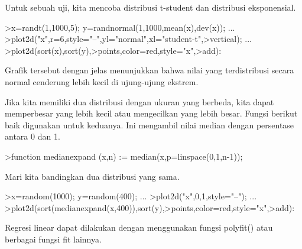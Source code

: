 \documentclass[12pt,arial,letterpaper]{book}
\begin{document}
\begin{eulercomment}
\begin{eulercomment}
\begin{eulercomment}
\begin{eulercomment}
\begin{eulercomment}
\begin{eulercomment}
\begin{eulercomment}
\begin{eulercomment}
\begin{eulercomment}
\begin{eulercomment}
\begin{eulercomment}
\begin{eulercomment}
\begin{eulercomment}
\begin{eulercomment}
\begin{eulercomment}
\begin{eulercomment}
\begin{eulercomment}
\begin{eulercomment}
\begin{eulercomment}
\begin{eulercomment}
\begin{eulercomment}
\begin{eulercomment}
\begin{eulercomment}
\begin{eulercomment}
\begin{eulercomment}
\begin{eulercomment}
\begin{eulercomment}
\begin{eulercomment}
\begin{eulercomment}
\begin{eulercomment}
\begin{eulercomment}
\begin{eulercomment}
\begin{eulercomment}
Untuk sebuah uji, kita mencoba distribusi t-student dan distribusi
eksponensial.
\end{eulercomment}
\begin{eulerprompt}
>x=randt(1,1000,5); y=randnormal(1,1000,mean(x),dev(x)); ...
>plot2d("x",r=6,style="--",yl="normal",xl="student-t",>vertical); ...
>plot2d(sort(x),sort(y),>points,color=red,style="x",>add):
\end{eulerprompt}
\begin{eulercomment}
Grafik tersebut dengan jelas menunjukkan bahwa nilai yang
terdistribusi secara normal cenderung lebih kecil di ujung-ujung
ekstrem.

Jika kita memiliki dua distribusi dengan ukuran yang berbeda, kita
dapat memperbesar yang lebih kecil atau mengecilkan yang lebih besar.
Fungsi berikut baik digunakan untuk keduanya. Ini mengambil nilai
median dengan persentase antara 0 dan 1.
\end{eulercomment}
\begin{eulerprompt}
>function medianexpand (x,n) := median(x,p=linspace(0,1,n-1));
\end{eulerprompt}
\begin{eulercomment}
Mari kita bandingkan dua distribusi yang sama.
\end{eulercomment}
\begin{eulerprompt}
>x=random(1000); y=random(400); ...
>plot2d("x",0,1,style="--"); ...
>plot2d(sort(medianexpand(x,400)),sort(y),>points,color=red,style="x",>add):
\end{eulerprompt}
\begin{eulercomment}
Regresi linear dapat dilakukan dengan menggunakan fungsi polyfit()
atau berbagai fungsi fit lainnya.


\end{eulercomment}
\end{eulercomment}
\end{eulercomment}
\end{eulercomment}
\end{eulercomment}
\end{eulercomment}
\end{eulercomment}
\end{eulercomment}
\end{eulercomment}
\end{eulercomment}
\end{eulercomment}
\end{eulercomment}
\end{eulercomment}
\end{eulercomment}
\end{eulercomment}
\end{eulercomment}
\end{eulercomment}
\end{eulercomment}
\end{eulercomment}
\end{eulercomment}
\end{eulercomment}
\end{eulercomment}
\end{eulercomment}
\end{eulercomment}
\end{eulercomment}
\end{eulercomment}
\end{eulercomment}
\end{eulercomment}
\end{eulercomment}
\end{eulercomment}
\end{eulercomment}
\end{eulercomment}
\end{eulercomment}
\end{document}
